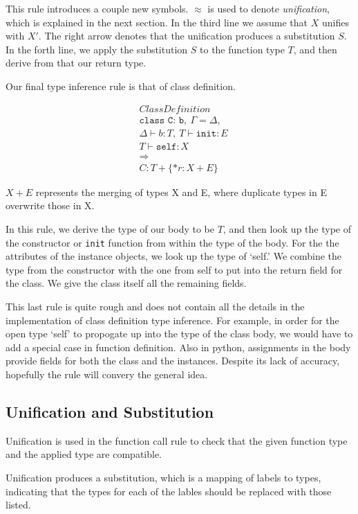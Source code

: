 \documentclass{article}
\begin{document}
This rule introduces a couple new symbols. $\approx$ is used to denote
\emph{unification}, which is explained in the next section. In the third line
we assume that $X$ unifies with $X'$. The right arrow denotes that the
unification produces a substitution $S$. In the forth line, we apply the
substitution $S$ to the function type $T$, and then derive from that our return
type.

Our final type inference rule is that of class definition.

\begin{align*}
&ClassDefinition\\
& \texttt{class C: b},\ \Gamma = \Delta, \\
& \Delta \vdash b : T,\ T \vdash \texttt{init}:E \\
& T \vdash \texttt{self} : X \\
& \Longrightarrow \\
& C : T + \{*r : X + E \}
\end{align*}

$X + E$ represents the merging of types X and E, where duplicate types in E overwrite those in X.

In this rule, we derive the type of our body to be $T$, and then look up the
type of the constructor or \texttt{init} function from within the type of the
body. For the the attributes of the instance objects, we look up the type of
`self.' We combine the type from the constructor with the one from self to put
into the return field for the class. We give the class itself all the remaining
fields.

This last rule is quite rough and does not contain all the details in the
implementation of class definition type inference. For example, in order for
the open type `self' to propogate up into the type of the class body, we would
have to add a special case in function definition. Also in python, assignments
in the body provide fields for both the class and the instances.  Despite its
lack of accuracy, hopefully the rule will convery the general idea.

\subsection*{Unification and Substitution}

Unification is used in the function call rule to check that the given
function type and the applied type are compatible.

Unification produces a substitution, which is a mapping of labels to types,
indicating that the types for each of the lables should be replaced with those
listed.
\end{document}
